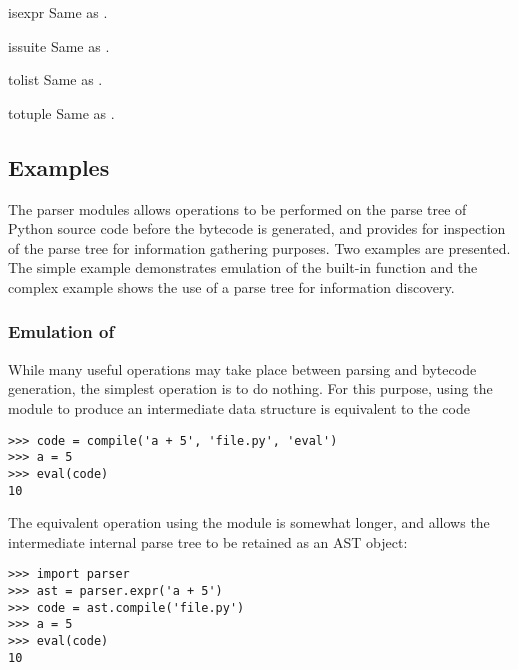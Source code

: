 \begin{methoddesc}[AST]{isexpr}{}
Same as .
\end{methoddesc}

\begin{methoddesc}[AST]{issuite}{}
Same as .
\end{methoddesc}

\begin{methoddesc}[AST]{tolist}{}
Same as .
\end{methoddesc}

\begin{methoddesc}[AST]{totuple}{}
Same as .
\end{methoddesc}


\subsection{Examples \label{AST Examples}}

The parser modules allows operations to be performed on the parse tree
of Python source code before the bytecode is generated, and provides
for inspection of the parse tree for information gathering purposes.
Two examples are presented.  The simple example demonstrates emulation
of the  built-in function and
the complex example shows the use of a parse tree for information
discovery.

\subsubsection{Emulation of }

While many useful operations may take place between parsing and
bytecode generation, the simplest operation is to do nothing.  For
this purpose, using the  module to produce an
intermediate data structure is equivalent to the code

\begin{verbatim}
>>> code = compile('a + 5', 'file.py', 'eval')
>>> a = 5
>>> eval(code)
10
\end{verbatim}

The equivalent operation using the  module is somewhat
longer, and allows the intermediate internal parse tree to be retained
as an AST object:

\begin{verbatim}
>>> import parser
>>> ast = parser.expr('a + 5')
>>> code = ast.compile('file.py')
>>> a = 5
>>> eval(code)
10
\end{verbatim}

